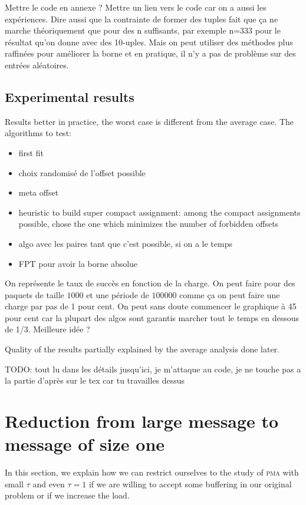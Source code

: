 \documentclass[10pt, conference, letterpaper]{IEEEtran}
\newcommand\pma{\textsc{pma}\xspace}
\newcommand{\todo}[1]{{\color{red} TODO: {#1}}}
\begin{document}
Mettre le code en annexe ? Mettre un lien vers le code car on a aussi les expériences.
Dire aussi que la contrainte de former des tuples fait que ça ne marche théoriquement que pour des n suffisants, 
par exemple n=333 pour le résultat qu'on donne avec des 10-uples. Mais on peut utiliser des méthodes
plus raffinées pour améliorer la borne et en pratique, il n'y a pas de problème sur des entrées aléatoires.

\subsection{Experimental results}

Results better in practice, the worst case is different from the 
average case.
The algorithms to test:
\begin{itemize}
	\item first fit
	\item choix randomisé de l'offset possible
	\item meta offset
	\item heuristic to build super compact assignment: among the compact assignments
possible, chose the one which minimizes the number of forbidden offsets
	\item algo avec les paires tant que c'est possible, si on a le temps
	\item FPT pour avoir la borne absolue
\end{itemize}

On représente le taux de succès en fonction de la charge. On peut faire
pour des paquets de taille $1000$ et une période de $100 000$ comme ça on
peut faire une charge par pas de 1 pour cent. On peut sans doute commencer
le graphique à 45 pour cent car la plupart des algos sont garantis marcher 
tout le temps en dessous de 1/3. 
Meilleure idée ? 

Quality of the results partially explained by the average analysis done later.
 
\todo{tout lu dans les détails jusqu'ici, je m'attaque au code, je ne touche pas a la partie d'après  sur le tex car tu travailles dessus}

\section{Reduction from large message to message of size one}

In this section, we explain how we can restrict ourselves to the study of \pma
with small $\tau$ and even $\tau = 1$ if we are willing to accept some buffering in our original problem or if we increase the load.
\end{document}
